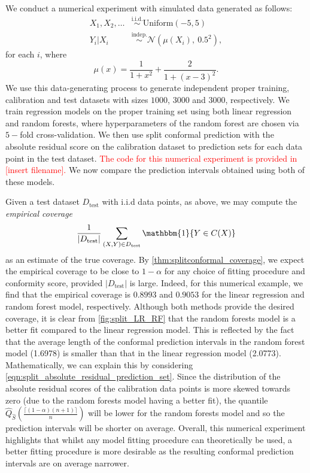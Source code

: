 \documentclass[11pt, titlepage]{article} %
\newcommand{\R}{\mathrm}
\numberwithin{equation}{section}
\theoremstyle{definition}
\numberwithin{theorem}{section}
\numberwithin{lemma}{section}
\numberwithin{corollary}{section}
\numberwithin{proposition}{section}
\numberwithin{definition}{section}
\numberwithin{remark}{section}
\begin{document}
\noindent
We conduct a numerical experiment with simulated data generated as follows: \begin{align*}
    X_1, X_2, \ldots &\overset{\R{i.i.d.}}{\sim} \R{Uniform}(-5, 5) \\
    Y_i | X_i &\overset{\R{indep.}}{\sim} \mathcal{N}\left( \mu(X_i), \ 0.5^2 \right),
\end{align*} for each \(i\), where \[\mu(x) = \frac{1}{1+x^2} + \frac{2}{1+(x-3)^2}.\] We use this data-generating process to generate independent proper training, calibration and test datasets with sizes \(1000\), \(3000\) and \(3000\), respectively. We train regression models on the proper training set using both linear regression and random forests, where hyperparameters of the random forest are chosen via \(5-\)fold cross-validation. We then use split conformal prediction with the absolute residual score on the calibration dataset to prediction sets for each data point in the test dataset. \textcolor{red}{The code for this numerical experiment is provided in [insert filename].} We now compare the prediction intervals obtained using both of these models.\vskip5pt

\noindent
Given a test dataset \(D_\R{test}\) with i.i.d data points, as above, we may compute the \textit{empirical coverage} \[\frac{1}{|D_\R{test}|} \sum_{(X, Y) \in D_\R{test}} \mathbbm{1}\{ Y \in C(X) \}\] as an estimate of the true coverage. By \cref{thm:splitconformal_coverage}, we expect the empirical coverage to be close to \(1-\alpha\) for any choice of fitting procedure and conformity score, provided \(|D_\R{test}|\) is large. Indeed, for this numerical example, we find that the empirical coverage is \(0.8993\) and \(0.9053\) for the linear regression and random forest model, respectively. Although both methods provide the desired coverage, it is clear from \cref{fig:split_LR_RF} that the random forests model is a better fit compared to the linear regression model. This is reflected by the fact that the average length of the conformal prediction intervals in the random forest model (1.6978) is smaller than that in the linear regression model (2.0773). Mathematically, we can explain this by considering \eqref{eqn:split_absolute_residual_prediction_set}. Since the distribution of the absolute residual scores of the calibration data points is more skewed towards zero (due to the random forests model having a better fit), the quantile \(\hat{Q}_{\hat{S}} \left( \frac{\lceil (1-\alpha)(n+1) \rceil}{n} \right)\) will be lower for the random forests model and so the prediction intervals will be shorter on average. Overall, this numerical experiment highlights that whilst any model fitting procedure can theoretically be used, a better fitting procedure is more desirable as the resulting conformal prediction intervals are on average narrower.
\end{document}

